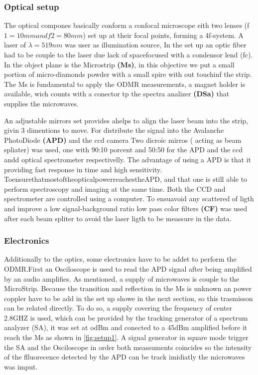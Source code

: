  \subsubsection{Optical setup}
The optical compones basically conform a confocal microscope eith two lenses (f$1=10mm and f2=80mm$) set up at their focal points, forming a 4f-system. A laser of $\lambda=519nm$ was user as illumination source, In the set up an optic fiber had to be couple to the laser due lack of spacefocused with a condensor lend (fc).
In the object plane is the Microstrip \textbf{(Ms)}, in this objective we put a small portion of micro-diamonds powder with a small spire with out touchinf the strip. The Ms is fundamental to apply the ODMR measurements, a magnet holder is available, wich counts with a conector tp the spectra analizer \textbf{(DSa)} that supplies the microwaves.

An adjustable mirrors set provides ahelps to align the laser beam into the strip, givin 3 dimentions to move. For distribute the signal into the Avalanche PhotoDiode \textbf{(APD)} and the ccd camera Two dicroic mirros ( acting as beam spliater) was used, one with 90:10 porcent and 50:50 for the APD and the ccd andd optical spectrometer respectivelly. The advantage of using a APD is that it providing fast response in time and high sensitivity. ToensurethatmostoftheopticalpowerreachestheAPD, and that one is still able to perform spectroscopy and imaging at the same time. Both the CCD and spectrometer are controlled using a computer. To ensuavoid any scattered of ligth and improve a low signal-background ratio  low pass color filters \textbf{(CF)} was used after each beam spliter to avoid the laser ligth to be meassure in the data.

\subsubsection{Electronics}

Additionally to the optics, some electronics have to be addet to perform the ODMR.First an Osciloscope is used to read the APD signal after being amplified by an audio amplifies.  As mentioned, a supply of microwaves is couple to the MicroStrip.
Because the transition and reflection in the Ms is unknown an power coppler have to be add in the set up showe in the next section, so this trasmisson can be related directly.  To do so, a supply covering the frequency of center 2.8GHZ is used, which can be provided by the tracking generator of a spectrum analyzer (SA), it was set at odBm and conected to a 45dBm amplified before it reach the Ms as shown in \ref{fig:setup1}.
 A signal generator in square mode trigger the SA and the Osciloscope in order both meassuments coincides so the intensity of the flluorecence detected by the APD can be track imidiatly the microwaves was imput.
 
